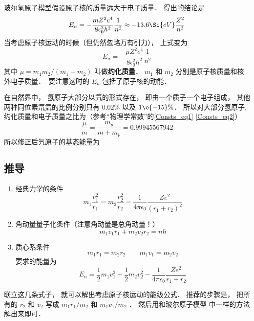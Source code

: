 
玻尔氢原子模型假设原子核的质量远大于电子质量． 得出的结论是
\begin{equation}
E_n = -\frac{mZ^2 e^4}{8\epsilon_0^2 h^2}\frac{1}{n^2} \approx  - 13.6\Si{eV} \frac{Z^2}{n^2}
\end{equation}
当考虑原子核运动的时候（但仍然忽略万有引力）， 上式变为
\begin{equation}\label{HRMass_eq1}
E_n = -\frac{\mu Z^2 e^4}{8\epsilon_0^2 h^2} \frac{1}{n^2}
\end{equation}
其中 $\mu  = m_1 m_2/(m_1 + m_2)$ 叫做\textbf{约化质量}． $m_1$ 和 $m_2$ 分别是原子核质量和核外电子质量．　要注意这时的 $E_n$ 包括了原子核的动能．

在自然界中， 氢原子大部分以氕的形式存在， 即由一个质子一个电子组成， 其他两种同位素氘氚的比例分别只有 $0.02\%$ 以及 $1\e{-15}\%$． 所以对大部分氢原子, 约化质量和电子质量之比为（参考“物理学常数”的\autoref{Consts_eq1} \autoref{Consts_eq2}）
\begin{equation}
\frac{\mu}{m} = \frac{m_p}{m + m_p} = 0.99945567942
\end{equation}
所以修正后氕原子的基态能量为
\begin{equation}

\end{equation}

\subsection{推导}
\begin{enumerate}
\item 经典力学的条件
\begin{equation}
m_1 \frac{v_1^2}{r_1} = m_2 \frac{v_2^2}{r_2} = \frac{1}{4\pi\epsilon_0} \frac{Z e^2}{(r_1 + r_2)^2}
\end{equation}
\item 角动量量子化条件（注意角动量是总角动量！）
\begin{equation}
m_1 v_1 r_1 + m_2 v_2 r_2 = n\hbar 
\end{equation}
\item 质心系条件
\begin{equation}
m_1 r_1 = m_2 r_2 \qquad m_1 v_1 = m_2 v_2
\end{equation}
要求的能量为
\begin{equation}
E_n = \frac12 m_1 v_1^2 + \frac12 m_2 v_2^2 - \frac{1}{4\pi\epsilon_0} \frac{Z e^2}{r_1 + r_2}
\end{equation}
\end{enumerate}
联立这几条式子， 就可以解出考虑原子核运动的能级公式． 推荐的步骤是， 把所有的 $r_2$ 和 $v_2$ 写成 $m_1 r_1/m_2$ 和 $m_1 v_1/m_2$ ． 然后用和玻尔原子模型%
中一样的方法解出来即可．
